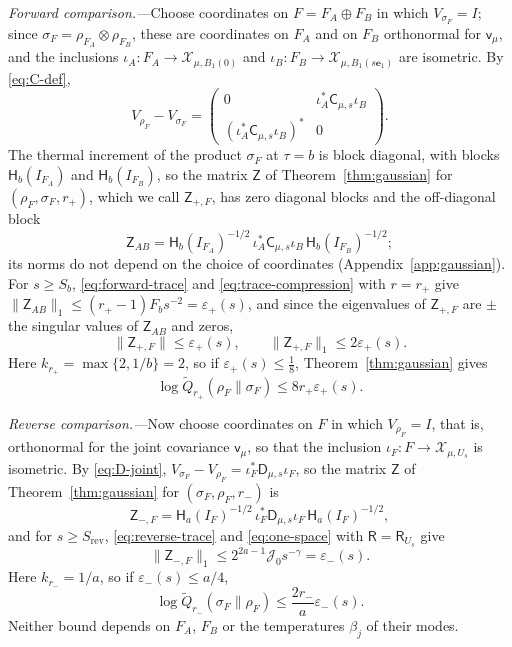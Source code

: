\documentclass[aps,prl,reprint,longbibliography,raggedbottom]{revtex4-2}
\newcommand{\norm}[1]{\lVert #1\rVert}
\newcommand{\Res}{\mathsf R}
\newcommand{\JointRes}{\Res_{U_s}}
\newcommand{\JointD}{\mathsf D}
\newcommand{\Therm}{\mathsf H}
\newcommand{\Qtil}{\widetilde Q}
\newcommand{\cov}{\mathsf v}
\newcommand{\eone}{\mathbf e_1}
\begin{document}
\emph{Forward comparison.---}Choose coordinates on
$F=F_A\oplus F_B$ in which $V_{\sigma_F}=I$; since
$\sigma_F=\rho_{F_A}\otimes\rho_{F_B}$, these are coordinates on
$F_A$ and on $F_B$ orthonormal for $\cov_\mu$, and the inclusions
$\iota_A\colon F_A\to\mathcal X_{\mu,B_1(0)}$ and
$\iota_B\colon F_B\to\mathcal X_{\mu,B_1(s\eone)}$ are isometric. By
\eqref{eq:C-def},
\[
V_{\rho_F}-V_{\sigma_F}=\begin{pmatrix}0&\iota_A^*\mathsf C_{\mu,s}\iota_B\\
(\iota_A^*\mathsf C_{\mu,s}\iota_B)^*&0\end{pmatrix}.
\]
The thermal increment of the product $\sigma_F$ at $\tau=b$ is
block diagonal, with blocks $\Therm_b(I_{F_A})$ and
$\Therm_b(I_{F_B})$, so the matrix $\mathsf Z$ of
Theorem~\ref{thm:gaussian} for $(\rho_F,\sigma_F,r_+)$, which we call
$\mathsf Z_{+,F}$, has zero diagonal blocks and the off-diagonal
block
\[
\mathsf Z_{AB}=\Therm_b(I_{F_A})^{-1/2}\,
\iota_A^*\mathsf C_{\mu,s}\iota_B\,\Therm_b(I_{F_B})^{-1/2};
\]
its norms do not depend on the choice of coordinates
(Appendix~\ref{app:gaussian}). For $s\ge S_b$,
\eqref{eq:forward-trace} and \eqref{eq:trace-compression} with
$r=r_+$ give
$\norm{\mathsf Z_{AB}}_1\le(r_+-1)F_bs^{-2}=\varepsilon_+(s)$,
and since the eigenvalues of $\mathsf Z_{+,F}$ are $\pm$ the singular
values of $\mathsf Z_{AB}$ and zeros,
\begin{equation}
\norm{\mathsf Z_{+,F}}\le\varepsilon_+(s),\qquad
\norm{\mathsf Z_{+,F}}_1\le2\varepsilon_+(s).
\label{eq:finite-forward}
\end{equation}
Here $k_{r_+}=\max\{2,1/b\}=2$, so if $\varepsilon_+(s)\le\frac18$,
Theorem~\ref{thm:gaussian} gives
\begin{equation}
\log\Qtil_{r_+}(\rho_F\|\sigma_F)\le8r_+\varepsilon_+(s).
\label{eq:Qforward}
\end{equation}

\emph{Reverse comparison.---}Now choose coordinates on $F$ in
which $V_{\rho_F}=I$, that is, orthonormal for the joint covariance
$\cov_\mu$, so that the inclusion $\iota_F\colon F\to\mathcal X_{\mu,U_s}$
is isometric. By \eqref{eq:D-joint},
$V_{\sigma_F}-V_{\rho_F}=\iota_F^*\JointD_{\mu,s}\iota_F$, so the
matrix $\mathsf Z$ of Theorem~\ref{thm:gaussian} for
$(\sigma_F,\rho_F,r_-)$ is
\[
\mathsf Z_{-,F}=\Therm_a(I_F)^{-1/2}\,\iota_F^*\JointD_{\mu,s}\iota_F\,\Therm_a(I_F)^{-1/2},
\]
and for $s\ge S_{\mathrm{rev}}$, \eqref{eq:reverse-trace} and
\eqref{eq:one-space} with $\Res=\JointRes$ give
\begin{equation}
\norm{\mathsf Z_{-,F}}_1\le2^{2a-1}\mathcal J_0s^{-\gamma}=\varepsilon_-(s).
\label{eq:finite-reverse}
\end{equation}
Here $k_{r_-}=1/a$, so if $\varepsilon_-(s)\le a/4$,
\begin{equation}
\log\Qtil_{r_-}(\sigma_F\|\rho_F)\le\frac{2r_-}a\varepsilon_-(s).
\label{eq:Qreverse}
\end{equation}
Neither bound depends on $F_A$, $F_B$ or the temperatures
$\beta_j$ of their modes.
\end{document}

